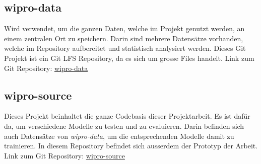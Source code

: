 \subsection{wipro-data}
\label{sub:wipro-data}
Wird verwendet, um die ganzen Daten, welche im Projekt genutzt werden, an einem zentralen Ort zu speichern. Darin sind
mehrere Datensätze vorhanden, welche im Repository aufbereitet und statistisch analysiert werden. Dieses Git Projekt ist
ein Git LFS Repository, da es sich um grosse Files handelt.
\newline
Link zum Git Repository: \hyperlink{https://gitlab.enterpriselab.ch/Pwn3rs/wipro-data}{wipro-data}
\newline
{}

\subsection{wipro-source}
\label{sub:wipro-source}
Dieses Projekt beinhaltet die ganze Codebasis dieser Projektarbeit. Es ist dafür da, um verschiedene Modelle zu testen
und zu evaluieren. Darin befinden sich auch Datensätze von \textit{wipro-data}, um die entsprechenden Modelle damit zu
trainieren. In diesem Repository befindet sich ausserdem der Prototyp der Arbeit.
\newline
Link zum Git Repository: \hyperlink{https://gitlab.enterpriselab.ch/Pwn3rs/wipro-source}{wipro-source}
\newline
{}

